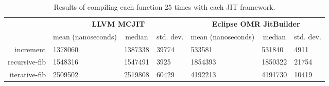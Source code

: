 \begin{table*}[t]
  \begin{tabular}{|r|l|l|l|l||l|l|}
  \hline
  \multicolumn{1}{|l|}{\multirow{2}{*}{}} & \multicolumn{3}{c|}{\textbf{LLVM MCJIT}}                                                                                     & \multicolumn{3}{c|}{\textbf{Eclipse OMR JitBuilder}}                                                                              \\ \cline{2-7}
  \multicolumn{1}{|c|}{\textbf{Program}}  & \multicolumn{1}{c|}{mean (nanoseconds)}  & \multicolumn{1}{c|}{median}  & \multicolumn{1}{c|}{std. dev.}                & \multicolumn{1}{c|}{mean (nanoseconds)}  & \multicolumn{1}{c|}{median}  & \multicolumn{1}{c|}{std. dev.}             \\ \hline
  increment                               & \num{1378060}                            & \num{1387338}                & \num{39774}                                        & \num{533581}                             & \num{531840}                & \num{4911}                                      \\ \hline
  recursive-fib                           & \num{1548316}                            & \num{1547491}                & \num{3925}                                         & \num{1854393}                            & \num{1850322}               & \num{21754}                                     \\ \hline
  iterative-fib                           & \num{2509502}                            & \num{2519808}                & \num{60429}                                        & \num{4192213}                            & \num{4191730}               & \num{10419}                                     \\ \hline
  \end{tabular}
  \caption{Results of compiling each function 25 times with each JIT framework.}
  \label{tab:compile_time}
\end{table*}

